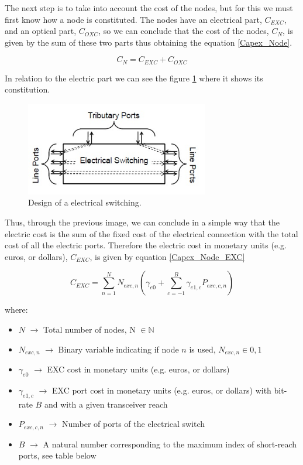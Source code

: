 \vspace{11pt}
The next step is to take into account the cost of the nodes, but for this we must first know how a node is constituted. The nodes have an electrical part, $C_{EXC}$, and an optical part, $C_{OXC}$, so we can conclude that the cost of the nodes, $C_N$, is given by the sum of these two parts thus obtaining the equation \ref{Capex_Node}.

\begin{equation}
C_N = C_{EXC} + C_{OXC}
\label{Capex_Node}
\end{equation}

\vspace{11pt}
In relation to the electric part we can see the figure \ref{exc_design} where it shows its constitution.

\begin{figure}[h!]
\centering
\includegraphics[width=8cm]{sdf/ILP/figures/exc_design}
\caption{Design of a electrical switching.}
\label{exc_design}
\end{figure}


Thus, through the previous image, we can conclude in a simple way that the electric cost is the sum of the fixed cost of the electrical connection with the total cost of all the electric ports.
Therefore the electric cost in monetary units (e.g. euros, or dollars), $C_{EXC}$, is given by equation \ref{Capex_Node_EXC}

\begin{equation}
C_{EXC} = \sum_{n=1}^{N} N_{exc,n} \left( \gamma_{e0} + \sum_{c=-1}^B \gamma_{e1,c} P_{exc,c,n} \right)
\label{Capex_Node_EXC}
\end{equation}

where:
\begin{itemize}
\item{$N$				$\rightarrow$	Total number of nodes, N $\in \mathbb{N}$}
\item{$N_{exc,n}$		$\rightarrow$	Binary variable indicating if node $n$ is used, $N_{exc,n} \in {0, 1}$}
\item{$\gamma_{e0}$ 	$\rightarrow$	EXC cost in monetary units (e.g. euros, or dollars)}
\item{$\gamma_{e1,c}$	$\rightarrow$	EXC port cost in monetary units (e.g. euros, or dollars) with bit-rate $B$ and with a given transceiver reach}
\item{$P_{exc,c,n}$	    $\rightarrow$	Number of ports of the electrical switch}
\item{$B$           	$\rightarrow$	A natural number corresponding to the maximum index of short-reach ports, see table below}
\end{itemize}

